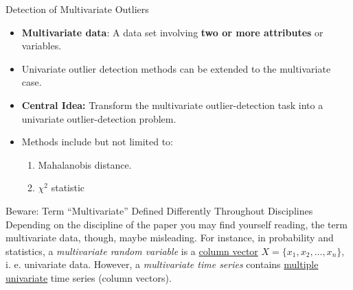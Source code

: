 \begin{frame}{Detection of Multivariate Outliers}
	\begin{itemize}
		\item \textbf{Multivariate data}: A data set involving \textbf{\color{faugray}two or more attributes} or variables.
		\item Univariate outlier detection methods can be extended to the multivariate case.
		\item \textbf{Central Idea:} Transform the multivariate outlier-detection task into a univariate outlier-detection problem.
		\item Methods include but not limited to:
		      \begin{enumerate}
			      \item Mahalanobis distance.
			      \item $\chi^2$ statistic
		      \end{enumerate}
	\end{itemize}
	\begin{alertblock}{Beware: Term ``Multivariate'' Defined Differently Throughout Disciplines}
		Depending on the discipline of the paper you may find yourself reading, the term multivariate data, though, maybe misleading. For instance, in probability and statistics, a \textit{multivariate random variable} is a \underline{column vector} $X=\{x_1, x_2, \dots, x_n\}$, i. e. univariate data. However, a \textit{multivariate time series} contains \underline{multiple univariate} time series (column vectors).
	\end{alertblock}
\end{frame}


